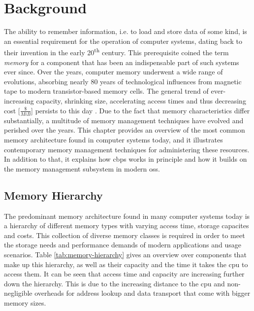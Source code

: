 \chapter{Background}
\label{chap:background}

The ability to remember information, i.e. to load and store data of some kind, is an essential requirement for the operation of computer systems, dating back to their invention in the early 20\textsuperscript{th} century.
This prerequisite coined the term \emph{memory} for a component that has been an indispensable part of such systems ever since.
Over the years, computer memory underwent a wide range of evolutions, absorbing nearly 80 years of technological influences from magnetic tape to modern transistor-based memory cells.
The general trend of ever-increasing capacity, shrinking size, accelerating access times and thus decreasing cost [\emph{$\frac{\$}{MiB}$}] persists to this day \cite{memory-price}.
Due to the fact that memory characteristics differ substantially, a multitude of memory management techniques have evolved and perished over the years.
This chapter provides an overview of the most common memory architecture found in computer systems today, and it illustrates contemporary memory management techniques for administering these resources.
In addition to that, it explains how \ac{cbps} works in principle and how it builds on the memory management subsystem in modern \acp{os}.

\section{Memory Hierarchy}
\label{sec:memory-hierarchy}

The predominant memory architecture found in many computer systems today is a hierarchy of different memory types with varying access time, storage capacites and costs.
This collection of diverse memory classes is required in order to meet the storage needs and performance demands of modern applications and usage scenarios.
Table \ref{tab:memory-hierarchy} gives an overview over components that make up this hierarchy, as well as their capacity and the time it takes the \ac{cpu} to access them.
It can be seen that access time and capacity are increasing further down the hierarchy.
This is due to the increasing distance to the \ac{cpu} and non-negligible overheads for address lookup and data transport that come with bigger memory sizes.

